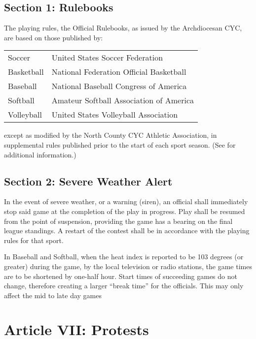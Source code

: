 \documentclass[letteraper,10pt,oneside,draft]{memoir}
\begin{document}
\subsection{Section 1: Rulebooks}
\label{ssec:const-6-1}
The playing rules, the Official Rulebooks, as issued by the Archdiocesan CYC, are based on those published by:
\begin{center}
    \begin{tabular}{l l}
        Soccer & United States Soccer Federation \\
        Basketball & National Federation Official Basketball \\
        Baseball & National Baseball Congress of America \\
        Softball & Amateur Softball Association of America \\
        Volleyball & United States Volleyball Association \\
    \end{tabular}
\end{center}
except as modified by the North County CYC Athletic Association, in supplemental rules published prior to the start of each sport season. (See  for additional information.)

\subsection{Section 2: Severe Weather Alert}
\label{ssec:const-6-2}
In the event of severe weather, or a warning (siren), an official shall immediately stop said game at the completion of the play in progress.  Play shall be resumed from the point of suspension, providing the game has a bearing on the final league standings. A restart of the contest shall be in accordance with the playing rules for that sport. 

In Baseball and Softball, when the heat index is reported to be 103 degrees (or greater) during the game, by the local television or radio stations, the game times are to be shortened by one-half hour. Start times of succeeding games do not change, therefore creating a larger ``break time'' for the officials. This may only affect the mid to late day games

\section{Article VII: Protests}
\label{sec:const-7}
\end{document}
